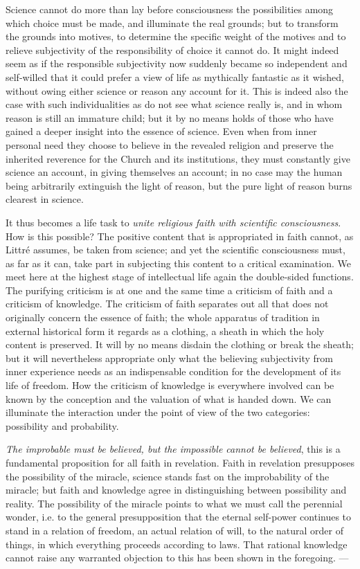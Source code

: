 \documentclass[12pt,a4paper,openany]{book}
\newcommand{\opage}[1]{\marginnote{\footnotesize\textit{[#1]}}}
\begin{document}
\setcounter{footnote}{0}%
\opage{211}Science cannot do more than lay before consciousness the possibilities among
which choice must be made, and illuminate the real grounds; but to transform the
grounds into motives, to determine the specific weight of the motives and to relieve
subjectivity of the responsibility of choice it cannot do. It might indeed seem as if
the responsible subjectivity now suddenly became so independent and self-willed that it
could prefer a view of life as mythically fantastic as it wished, without owing either
science or reason any account for it. This is indeed also the case with such
individualities as do not see what science really is, and in whom reason is still an
immature child; but it by no means holds of those who have gained a deeper insight into
the essence of science. Even when from inner personal need they choose to believe in
the revealed religion and preserve the inherited reverence for the Church and its
institutions, they must constantly give science an account, in giving themselves an
account; in no case may the human being arbitrarily extinguish the light of reason, but
the pure light of reason burns clearest in science.


It thus becomes a life task to \emph{unite religious faith with scientific
consciousness}.
How is this possible? The positive content that is appropriated in faith cannot, as
Littré assumes, be taken from science; and yet the scientific consciousness must, as
far as it can, take part in subjecting this content to a critical examination. We meet
here at the highest stage of intellectual life again the double-sided functions. The
purifying criticism is at one and the same time a criticism of faith and a criticism of
knowledge. The criticism of faith separates out all that does not originally concern
the essence of faith; the whole apparatus of tradition in external historical form it
regards as a clothing, a sheath in which the holy content is preserved. It will by no
means disdain the clothing or break the sheath; but it will nevertheless appropriate
only what the believing subjectivity from inner
\setcounter{footnote}{0}%
\opage{212}experience needs as an indispensable condition for the development of its life of
freedom. How the criticism of knowledge is everywhere involved can be known by the
conception and the valuation of what is handed down. We can illuminate the interaction
under the point of view of the two categories: possibility and probability.

\emph{The improbable must be believed, but the impossible
cannot be believed}, this is a fundamental proposition for
all faith in revelation. Faith in revelation presupposes the possibility of the miracle,
science stands fast on the improbability of the miracle; but faith and knowledge agree
in distinguishing between possibility and reality. The possibility of the miracle points
to what we must call the perennial wonder, i.e. to the general presupposition that the
eternal self-power continues to stand in a relation of freedom, an actual relation of
will, to the natural order of things, in which everything proceeds according to laws.
That rational knowledge cannot raise any warranted objection to this has been shown in
the foregoing. ---
\end{document}
